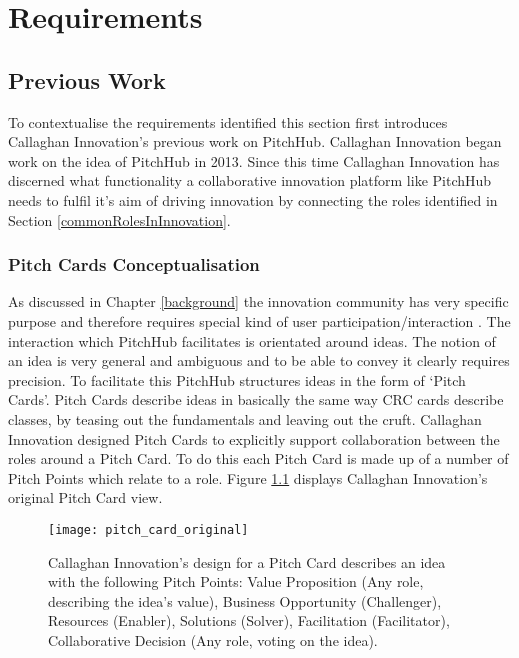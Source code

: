 \chapter{Requirements}\label{C:requirements}

\section{Previous Work}

To contextualise the requirements identified this section first introduces Callaghan Innovation's previous work on PitchHub. Callaghan Innovation began work on the idea of PitchHub in 2013. Since this time Callaghan Innovation has discerned what functionality a collaborative innovation platform like PitchHub needs to fulfil it's aim of driving innovation by connecting the roles identified in Section \ref{commonRolesInInnovation}.

\subsection{Pitch Cards Conceptualisation}
As discussed in Chapter \ref{background} the innovation community has very specific purpose and therefore requires special kind of user participation/interaction \cite{Jruby:online}. The interaction which PitchHub facilitates is orientated around ideas. The notion of an idea is very general and ambiguous and to be able to convey it clearly requires precision. To facilitate this PitchHub structures ideas in the form of `Pitch Cards'. Pitch Cards describe ideas in basically the same way CRC cards describe classes, by teasing out the fundamentals and leaving out the cruft. Callaghan Innovation designed Pitch Cards to explicitly support collaboration between the roles around a Pitch Card. To do this each Pitch Card is made up of a number of Pitch Points which relate to a role. Figure \ref{fig:pitch_card_original} displays Callaghan Innovation's original Pitch Card view.
\begin{figure}[ht]
    \centering
    \texttt{[image: pitch\_card\_original]}
    \caption{Callaghan Innovation's design for a Pitch Card describes an idea with the following Pitch Points: Value Proposition (Any role, describing the idea's value), Business Opportunity (Challenger), Resources (Enabler), Solutions (Solver), Facilitation (Facilitator), Collaborative Decision (Any role, voting on the idea).}
    \label{fig:pitch_card_original}
\end{figure}

